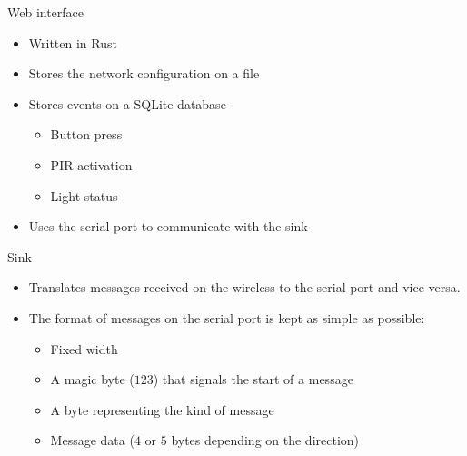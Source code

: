 \documentclass[italian]{beamer}
\begin{document}
\begin{frame}{Web interface}
    \begin{itemize}
        \item <1-> Written in Rust
        \item <2-> Stores the network configuration on a file
        \item <3-> Stores events on a SQLite database
            \begin{itemize}
                \item<4-> Button press
                \item<5-> PIR activation
                \item<6-> Light status
            \end{itemize}
        \item <7-> Uses the serial port to communicate with the sink
    \end{itemize}
\end{frame}

\begin{frame}{Sink}
    \begin{itemize}
        \item <1-> Translates messages received on the wireless to the serial port and vice-versa.
        \item <2-> The format of messages on the serial port is kept as simple as possible:
            \begin{itemize}
                \item <3-> Fixed width
                \item <4-> A magic byte ($123$) that signals the start of a message
                \item <5-> A byte representing the kind of message
                \item <6-> Message data ($4$ or $5$ bytes depending on the direction)
            \end{itemize}
    \end{itemize}
\end{frame}
\end{document}
